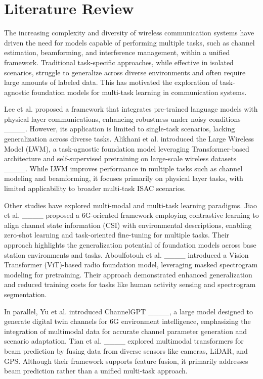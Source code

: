 \section{Literature Review}
The increasing complexity and diversity of wireless communication systems have driven the need for models capable of performing multiple tasks, such as channel estimation, beamforming, and interference management, within a unified framework. Traditional task-specific approaches, while effective in isolated scenarios, struggle to generalize across diverse environments and often require large amounts of labeled data. This has motivated the exploration of task-agnostic foundation models for multi-task learning in communication systems.


Lee et al. proposed a framework that integrates pre-trained language models with physical layer communications, enhancing robustness under noisy conditions ____. However, its application is limited to single-task scenarios, lacking generalization across diverse tasks. Alikhani et al. introduced the Large Wireless Model (LWM), a task-agnostic foundation model leveraging Transformer-based architecture and self-supervised pretraining on large-scale wireless datasets ____. While LWM improves performance in multiple tasks such as channel modeling and beamforming, it focuses primarily on physical layer tasks, with limited applicability to broader multi-task ISAC scenarios. 

Other studies have explored multi-modal and multi-task learning paradigms. Jiao et al. ____ proposed a 6G-oriented framework employing contrastive learning to align channel state information (CSI) with environmental descriptions, enabling zero-shot learning and task-oriented fine-tuning for multiple tasks. Their approach highlights the generalization potential of foundation models across base station environments and tasks. Aboulfotouh et al. ____ introduced a Vision Transformer (ViT)-based radio foundation model, leveraging masked spectrogram modeling for pretraining. Their approach demonstrated enhanced generalization and reduced training costs for tasks like human activity sensing and spectrogram segmentation.

In parallel, Yu et al. introduced ChannelGPT ____, a large model designed to generate digital twin channels for 6G environment intelligence, emphasizing the integration of multimodal data for accurate channel parameter generation and scenario adaptation. Tian et al. ____ explored multimodal transformers for beam prediction by fusing data from diverse sensors like cameras, LiDAR, and GPS. Although their framework supports feature fusion, it primarily addresses beam prediction rather than a unified multi-task approach.

